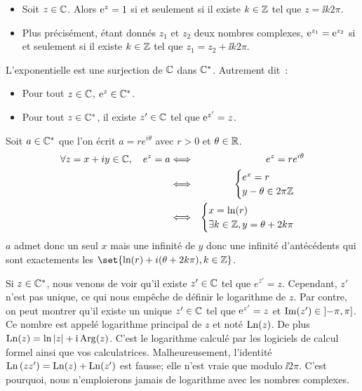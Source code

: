 \documentclass{magnoliaold}
\begin{document}
\begin{proposition}[utile=-3]
\begin{itemize}
\item Soit $z\in\mathbb{C}$. Alors ${\rm e}^z=1$ si et seulement si il existe
  $k\in\mathbb{Z}$ tel que $z=\ii k2\pi$.
\item  Plus précisément, étant donnés $z_1$ et $z_2$ deux nombres
  complexes, ${\rm e}^{z_1}={\rm e}^{z_2}$ si et seulement si il existe
  $k\in\mathbb{Z}$ tel que $z_1=z_2+\ii k2\pi$.
\end{itemize}
\end{proposition}

\begin{proposition}[utile=-3]
L'exponentielle est une surjection de $\mathbb{C}$ dans $\mathbb{C}^*$. Autrement dit~:
\begin{itemize}
\item Pour tout $z\in\mathbb{C}$, ${\rm e}^{z}\in\mathbb{C}^*$.
\item Pour tout $z\in\mathbb{C}^*$, il existe $z'\in\mathbb{C}$ tel que ${\rm e}^{z'}=z$.
\end{itemize}
\end{proposition}

\begin{preuve}
Soit $a\in \mathbb{C}^*$ que l'on écrit $a=re^{i\theta}$ avec $r>0$ et $\theta \in \mathbb{R}$.
\begin{eqnarray*}
\forall z=x+iy \in \mathbb{C}, \quad e^z=a & \Longleftrightarrow &e^z=re^{i\theta} \\
& \Longleftrightarrow & \begin{cases}
    e^x=r\\
    y-\theta \in 2\pi\mathbb{Z}
    \end{cases}\\
& \Longleftrightarrow & \begin{cases}
    x=\ln(r)\\
    \exists k \in \mathbb{Z}, y=\theta+2k\pi
    \end{cases}
\end{eqnarray*}
$a$ admet donc un seul $x$ mais une infinité de $y$ donc une infinité d'antécédents qui sont exactements les $\set{\ln(r)+i(\theta+2k\pi), k\in \Z}$.


\end{preuve}

\begin{remarqueUnique}
\remarque Si $z\in\mathbb{C}^*$, nous venons de voir qu'il existe $z'\in\mathbb{C}$ tel que
  $e^{z'}=z$. Cependant, $z'$ n'est pas unique, ce qui nous empêche de définir
  le logarithme de $z$. Par contre, on peut montrer qu'il existe un unique $z'\in\mathbb{C}$ tel que ${\rm e}^{z'}=z$ et
  $\mathop{\rm Im}(z')\in\left]-\pi,\pi\right]$. Ce nombre est appelé logarithme
  principal de $z$ et noté $\operatorname{Ln}(z)$. De plus $\operatorname{Ln}(z)=\ln\left|z\right|+{\rm i}\operatorname{Arg}(z)$. C'est le logarithme calculé par les logiciels de calcul formel ainsi que vos calculatrices. Malheureusement, l'identité $\operatorname{Ln}\left(z z'\right)=\operatorname{Ln}(z)+\operatorname{Ln}(z')$ est fausse;
  elle n'est vraie que modulo $\ii2\pi$. C'est pourquoi, nous n'emploierons
  jamais de logarithme avec les nombres complexes.
\end{remarqueUnique}
\end{document}

